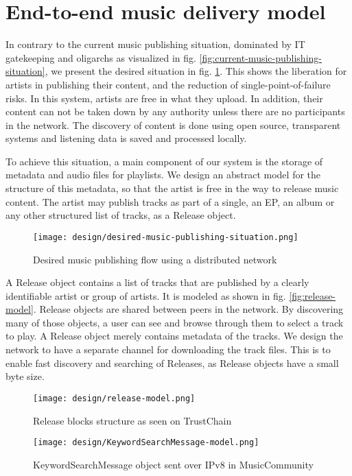 \section{End-to-end music delivery model}
\label{sec:release-model}
In contrary to the current music publishing situation, dominated by IT gatekeeping and oligarchs as visualized in fig. \ref{fig:current-music-publishing-situation}, we present the desired situation in fig. \ref{fig:desired-music-publishing-situation}. This shows the liberation for artists in publishing their content, and the reduction of single-point-of-failure risks. In this system, artists are free in what they upload. In addition, their content can not be taken down by any authority unless there are no participants in the network. The discovery of content is done using open source, transparent systems and listening data is saved and processed locally.

To achieve this situation, a main component of our system is the storage of metadata and audio files for playlists. We design an abstract model for the structure of this metadata, so that the artist is free in the way to release music content. The artist may publish tracks as part of a single, an EP, an album or any other structured list of tracks, as a Release object.

\begin{figure}
    \centering
    \texttt{[image: design/desired-music-publishing-situation.png]}
    \caption{Desired music publishing flow using a distributed network}
    \label{fig:desired-music-publishing-situation}
\end{figure}

A Release object contains a list of tracks that are published by a clearly identifiable artist or group of artists. It is modeled as shown in fig. \ref{fig:release-model}. Release objects are shared between peers in the network. By discovering many of those objects, a user can see and browse through them to select a track to play. A Release object merely contains metadata of the tracks. We design the network to have a separate channel for downloading the track files. This is to enable fast discovery and searching of Releases, as Release objects have a small byte size. 
\begin{figure}
        \centering
        \texttt{[image: design/release-model.png]}
        \caption{Release blocks structure as seen on TrustChain}
        \label{fig:release-model}
    \endminipage\hfill
        \centering
        \texttt{[image: design/KeywordSearchMessage-model.png]}
        \caption{KeywordSearchMessage object sent over IPv8 in MusicCommunity}
        \label{fig:keyword-search-message-model}
    \endminipage
\end{figure}

